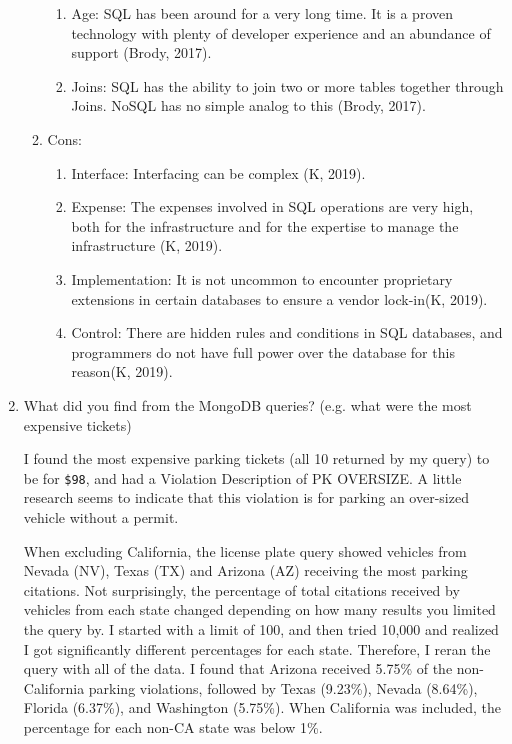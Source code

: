 \documentclass[]{article}
\begin{document}
\begin{enumerate}
\begin{enumerate}
\begin{enumerate}
				\item Age:  SQL has been around for a very long time.  It is a proven technology with plenty of developer experience and an abundance of support (Brody, 2017).
				\item Joins: SQL has the ability to join two or more tables together through Joins.  NoSQL has no simple analog to this (Brody, 2017).
			\end{enumerate}
			\item Cons:
			\begin{enumerate}
				\item Interface:  Interfacing can be complex (K, 2019).
				\item Expense: The expenses involved in SQL operations are very high, both for the infrastructure and for the expertise to manage the infrastructure (K, 2019).
				\item Implementation: It is not uncommon to encounter proprietary extensions in certain databases to ensure a vendor lock-in(K, 2019). 
				\item Control:  There are hidden rules and conditions in SQL databases, and programmers do not have full power over the database for this reason(K, 2019).
			\end{enumerate}
		\end{enumerate}

	
	\item What did you find from the MongoDB queries? (e.g. what were the most expensive tickets)
	
	I found the most expensive parking tickets (all 10 returned by my query) to be for \verb|$98|, and had a Violation Description of PK OVERSIZE.  A little research seems to indicate that this violation is for parking an over-sized vehicle without a permit.  
	
	When excluding California, the license plate query showed vehicles from Nevada (NV), Texas (TX) and Arizona (AZ) receiving the most parking citations.  Not surprisingly, the percentage of total citations received by vehicles from each state changed depending on how many results you limited the query by.  I started with a limit of 100, and then tried 10,000 and realized I got significantly different percentages for each state.  Therefore, I reran the query with all of the data.  I found that Arizona received 5.75\% of the non-California parking violations, followed by Texas (9.23\%), Nevada (8.64\%), Florida (6.37\%), and Washington (5.75\%).  When California was included, the percentage for each non-CA state was below 1\%.
	
\end{enumerate}
\end{document}
